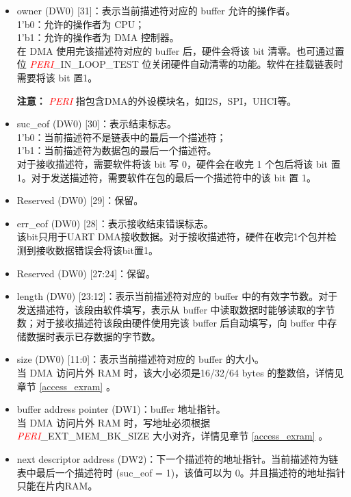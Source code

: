 \documentclass[main\_\_CN.tex]{subfiles}
\begin{document}
\begin{itemize}
    \item owner (DW0) [31]：表示当前描述符对应的 buffer 允许的操作者。\\
    1'b0：允许的操作者为 CPU；\\
    1'b1：允许的操作者为 DMA 控制器。\\
    在 DMA 使用完该描述符对应的 buffer 后，硬件会将该 bit 清零。也可通过置位 \textcolor{red}{\it{PERI}}\_IN\_LOOP\_TEST 位关闭硬件自动清零的功能。软件在挂载链表时需要将该 bit 置1。

    {\bfseries 注意： }\textcolor{red}{\it{PERI}} 指包含DMA的外设模块名，如I2S，SPI，UHCI等。
    \item suc\_eof (DW0) [30]：表示结束标志。\\
    1'b0：当前描述符不是链表中的最后一个描述符；\\
    1'b1：当前描述符为数据包的最后一个描述符。\\
    对于接收描述符，需要软件将该 bit 写 0，硬件会在收完 1 个包后将该 bit 置1。对于发送描述符，需要软件在包的最后一个描述符中的该 bit 置 1。
    \item Reserved (DW0) [29]：保留。
    \item err\_eof (DW0) [28]：表示接收结束错误标志。\\
    该bit只用于UART DMA接收数据。对于接收描述符，硬件在收完1个包并检测到接收数据错误会将该bit置1。
    \item Reserved (DW0) [27:24]：保留。
    \item length (DW0) [23:12]：表示当前描述符对应的 buffer 中的有效字节数。对于发送描述符，该段由软件填写，表示从 buffer 中读取数据时能够读取的字节数；对于接收描述符该段由硬件使用完该 buffer 后自动填写，向 buffer 中存储数据时表示已存数据的字节数。
    \item size (DW0) [11:0]：表示当前描述符对应的 buffer 的大小。\\
    当 DMA 访问片外 RAM 时，该大小必须是16/32/64 bytes 的整数倍，详情见章节 \ref{access_exram} \textit{}。
    \item buffer address pointer (DW1)：buffer 地址指针。\\
    当 DMA 访问片外 RAM 时，写地址必须根据 \textcolor{red}{\it{PERI}}\_EXT\_MEM\_BK\_SIZE 大小对齐，详情见章节 \ref{access_exram} \textit{}。
    \item next descriptor address (DW2)：下一个描述符的地址指针。当前描述符为链表中最后一个描述符时 (suc\_eof = 1)，该值可以为 0。并且描述符的地址指针只能在片内RAM。\\
\end{itemize}
\end{document}
